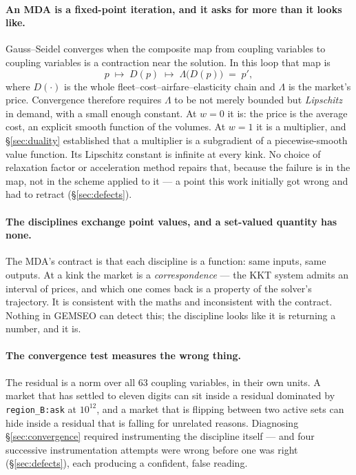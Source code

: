 \documentclass[11pt,a4paper]{article}
\newcommand{\var}[1]{\texttt{\small #1}}
\begin{document}
\paragraph{An MDA is a fixed-point iteration, and it asks for more than it looks like.}
Gauss--Seidel converges when the composite map from coupling variables to coupling
variables is a contraction near the solution. In this loop that map is
\[
p \;\longmapsto\; D(p) \;\longmapsto\; \Lambda\big(D(p)\big) \;=\; p' ,
\]
where $D(\cdot)$ is the whole fleet--cost--airfare--elasticity chain and $\Lambda$ is the
market's price. Convergence therefore requires $\Lambda$ to be not merely bounded but
\emph{Lipschitz} in demand, with a small enough constant. At $w=0$ it is: the price is
the average cost, an explicit smooth function of the volumes. At $w=1$ it is a
multiplier, and \S\ref{sec:duality} established that a multiplier is a subgradient of a
piecewise-smooth value function. Its Lipschitz constant is infinite at every kink. No
choice of relaxation factor or acceleration method repairs that, because the failure is
in the map, not in the scheme applied to it --- a point this work initially got wrong
and had to retract (\S\ref{sec:defects}).

\paragraph{The disciplines exchange point values, and a set-valued quantity has none.}
The MDA's contract is that each discipline is a function: same inputs, same outputs. At a
kink the market is a \emph{correspondence} --- the KKT system admits an interval of
prices, and which one comes back is a property of the solver's trajectory. It is
consistent with the maths and inconsistent with the contract. Nothing in GEMSEO can
detect this; the discipline looks like it is returning a number, and it is.

\paragraph{The convergence test measures the wrong thing.} The residual is a norm over
all 63 coupling variables, in their own units. A market that has settled to eleven
digits can sit inside a residual dominated by \var{region\_B:ask} at $10^{12}$, and a
market that is flipping between two active sets can hide inside a residual that is
falling for unrelated reasons. Diagnosing \S\ref{sec:convergence} required instrumenting the
discipline itself --- and four successive instrumentation attempts were wrong before one
was right (\S\ref{sec:defects}), each producing a confident, false reading.
\end{document}
